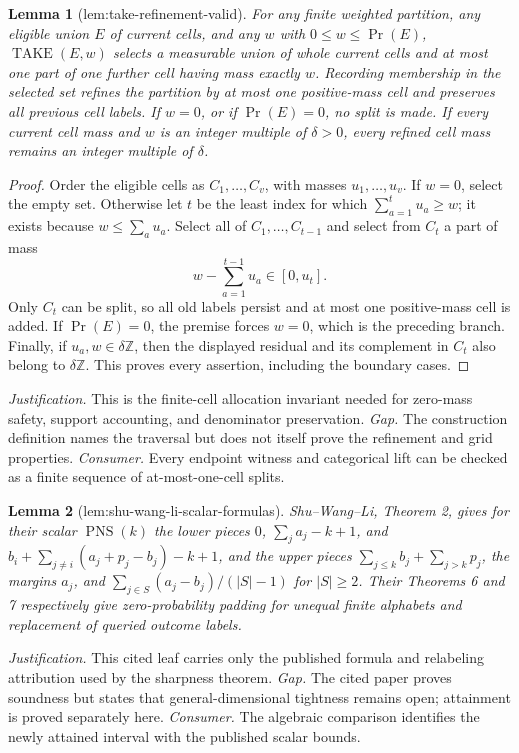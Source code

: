 \documentclass{article}
\newtheorem{lemma}{Lemma}
\begin{document}
\begin{lemma}[lem:take-refinement-valid]\label{lem:take-refinement-valid}
For any finite weighted partition, any eligible union \(E\) of current cells, and any \(w\) with \(0\leq w\leq\Pr(E)\), \(\operatorname{TAKE}(E,w)\) selects a measurable union of whole current cells and at most one part of one further cell having mass exactly \(w\).  Recording membership in the selected set refines the partition by at most one positive-mass cell and preserves all previous cell labels.  If \(w=0\), or if \(\Pr(E)=0\), no split is made.  If every current cell mass and \(w\) is an integer multiple of \(\delta>0\), every refined cell mass remains an integer multiple of \(\delta\).
\end{lemma}
\begin{proof}
Order the eligible cells as \(C_1,\ldots,C_v\), with masses \(u_1,\ldots,u_v\).  If \(w=0\), select the empty set.  Otherwise let \(t\) be the least index for which \(\sum_{a=1}^t u_a\geq w\); it exists because \(w\leq\sum_a u_a\).  Select all of \(C_1,\ldots,C_{t-1}\) and select from \(C_t\) a part of mass
\[
 w-\sum_{a=1}^{t-1}u_a\in[0,u_t].
\]
Only \(C_t\) can be split, so all old labels persist and at most one positive-mass cell is added.  If \(\Pr(E)=0\), the premise forces \(w=0\), which is the preceding branch.  Finally, if \(u_a,w\in\delta\mathbb Z\), then the displayed residual and its complement in \(C_t\) also belong to \(\delta\mathbb Z\).  This proves every assertion, including the boundary cases.
\end{proof}
\par\smallskip\noindent \textit{Justification.} This is the finite-cell allocation invariant needed for zero-mass safety, support accounting, and denominator preservation. \textit{Gap.} The construction definition names the traversal but does not itself prove the refinement and grid properties. \textit{Consumer.} Every endpoint witness and categorical lift can be checked as a finite sequence of at-most-one-cell splits.

\begin{lemma}[lem:shu-wang-li-scalar-formulas]\label{lem:shu-wang-li-scalar-formulas}
Shu--Wang--Li, Theorem 2, gives for their scalar \(\operatorname{PNS}(k)\) the lower pieces \(0\), \(\sum_ja_j-k+1\), and \(b_i+\sum_{j\ne i}(a_j+p_j-b_j)-k+1\), and the upper pieces \(\sum_{j\leq k}b_j+\sum_{j>k}p_j\), the margins \(a_j\), and \(\sum_{j\in S}(a_j-b_j)/(|S|-1)\) for \(|S|\geq2\).  Their Theorems 6 and 7 respectively give zero-probability padding for unequal finite alphabets and replacement of queried outcome labels.
\end{lemma}
\par\smallskip\noindent \textit{Justification.} This cited leaf carries only the published formula and relabeling attribution used by the sharpness theorem. \textit{Gap.} The cited paper proves soundness but states that general-dimensional tightness remains open; attainment is proved separately here. \textit{Consumer.} The algebraic comparison identifies the newly attained interval with the published scalar bounds.
\end{document}
